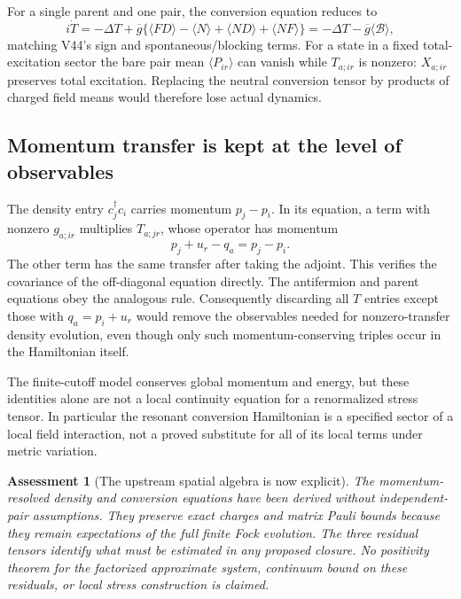 \documentclass[11pt]{article}
\newtheorem{assessment}[theorem]{Assessment}
\theoremstyle{remark}
\begin{document}
For a single parent and one pair, the conversion
equation reduces to
\[
 i\dot T=-\Delta T+
     \overline g\{\langle FD\rangle-\langle N\rangle+
                         \langle ND\rangle+\langle NF\rangle\}
           =-\Delta T-\overline g\langle\mathcal B\rangle,
\]
matching V44's sign and spontaneous/blocking terms.
For a state in a fixed total-excitation sector the
bare pair mean \(\langle P_{ir}\rangle\) can vanish
while \(T_{a;ir}\) is nonzero: \(X_{a;ir}\) preserves
total excitation.  Replacing the neutral conversion
tensor by products of charged field means would
therefore lose actual dynamics.

\subsection{Momentum transfer is kept at the level of observables}

The density entry \(c_j^\dagger c_i\) carries momentum
\(p_j-p_i\).  In its equation, a term with nonzero
\(g_{a;ir}\) multiplies
\(T_{a;jr}\), whose operator has momentum
\[
 p_j+u_r-q_a=p_j-p_i.
\]
The other term has the same transfer after taking
the adjoint.  This verifies the covariance of the
off-diagonal equation directly.  The antifermion
and parent equations obey the analogous rule.
Consequently discarding all \(T\) entries except
those with \(q_a=p_i+u_r\) would remove the observables
needed for nonzero-transfer density evolution,
even though only such momentum-conserving triples
occur in the Hamiltonian itself.

The finite-cutoff model conserves global momentum
and energy, but these identities alone are not
a local continuity equation for a renormalized
stress tensor.  In particular the resonant conversion
Hamiltonian is a specified sector of a local field
interaction, not a proved substitute for all of its
local terms under metric variation.

\begin{assessment}[The upstream spatial algebra is now explicit]
\label{ass:v20v69}
The momentum-resolved density and conversion equations
have been derived without independent-pair assumptions.
They preserve exact charges and matrix Pauli bounds
because they remain expectations of the full finite
Fock evolution.  The three residual tensors identify
what must be estimated in any proposed closure.
No positivity theorem for the factorized approximate
system, continuum bound on these residuals, or local
stress construction is claimed.
\end{assessment}
\end{document}
